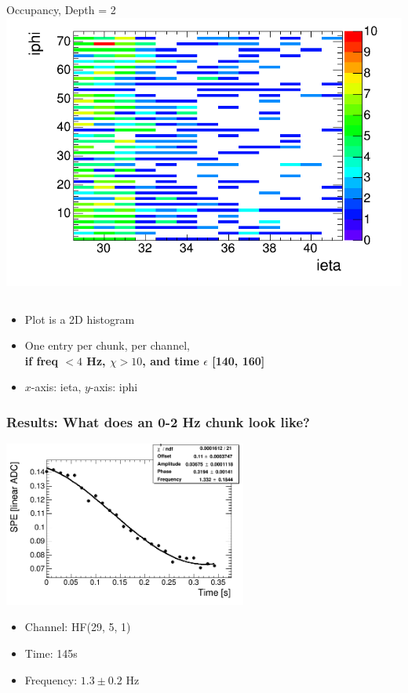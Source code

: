 \documentclass[bigger]{beamer}
\providecommand{\alert}[1]{\textbf{#1}}
\begin{document}
\begin{frame}
\begin{columns}
\begin{column}{0.55\textwidth}
\centering
Occupancy, Depth = 2
\includegraphics[width=\textwidth]{fig/occupancy_frequencyUnder4_time140to160_signifOver10_depth2_hist.png}
\end{column}
\end{columns}
\begin{itemize}

\item Plot is a 2D histogram
\label{sec-3-2-2-2}%

\item One entry per chunk, per channel,\\ \alert{if freq $< 4$ Hz, $\chi > 10$, and time $\epsilon$ [140, 160]}
\label{sec-3-2-2-3}%

\item $x$-axis: ieta, $y$-axis: iphi
\label{sec-3-2-2-4}%
\end{itemize} %
\end{frame}
\begin{frame}
\frametitle{Results: What does an 0-2 Hz chunk look like?}
\label{sec-3-2-3}
\label{sec-3-2-3-1}

\centering
\includegraphics[width=0.6\textwidth]{fig/fit_output_ieta29_iphi5_depth1_burst199.png}
\begin{itemize}

\item Channel: HF(29, 5, 1)
\label{sec-3-2-3-2}%

\item Time: 145s
\label{sec-3-2-3-3}%

\item Frequency: $1.3 \pm 0.2$ Hz
\label{sec-3-2-3-4}%
\end{itemize} %
\end{frame}
\end{document}
